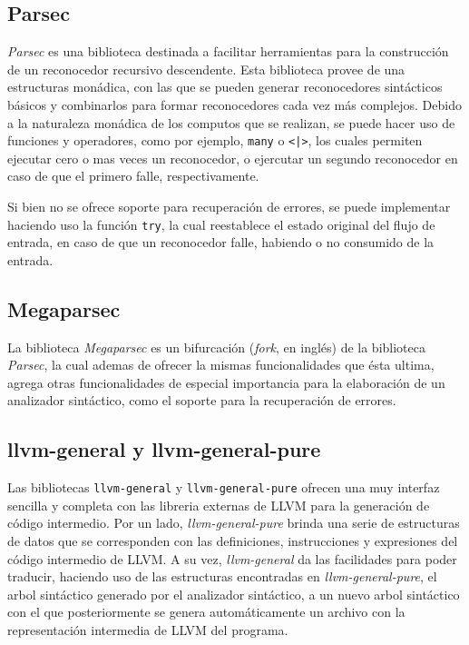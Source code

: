 \subsection{Parsec}
\textit{Parsec} es una biblioteca destinada a facilitar herramientas para la
construcción de un reconocedor recursivo descendente. Esta biblioteca provee
de una estructuras monádica, con las que se pueden generar reconocedores
sintácticos básicos y combinarlos para formar reconocedores cada vez más
complejos. Debido a la naturaleza monádica de los computos que se realizan, se
puede hacer uso de funciones y operadores, como por ejemplo, \texttt{many} o
\texttt{<|>}, los cuales permiten ejecutar cero o mas veces un reconocedor, o
ejercutar un segundo reconocedor en caso de que el primero falle,
respectivamente.

Si bien no se ofrece soporte para recuperación de errores, se puede
implementar haciendo uso la función \texttt{try}, la cual reestablece el
estado original del flujo de entrada, en caso de que un reconocedor falle,
habiendo o no consumido de la entrada.


\subsection{Megaparsec}
La biblioteca \textit{Megaparsec} es un bifurcación (\emph{fork}, en inglés)
de la biblioteca \textit{Parsec}, la cual ademas de ofrecer la mismas
funcionalidades que ésta ultima, agrega otras funcionalidades de especial
importancia para la elaboración de un analizador sintáctico, como el soporte
para la recuperación de errores.

\subsection{llvm-general y llvm-general-pure}
Las bibliotecas \texttt{llvm-general} y \texttt{llvm-general-pure} ofrecen una
muy interfaz sencilla y completa con las libreria externas de LLVM para la
generación de código intermedio. Por un lado, \textit{llvm-general-pure}
brinda una serie de estructuras de datos que se corresponden con las
definiciones, instrucciones y expresiones del código intermedio de LLVM. A su
vez, \textit{llvm-general} da las facilidades para poder traducir, haciendo
uso de las estructuras encontradas en \textit{llvm-general-pure}, el arbol
sintáctico generado por el analizador sintáctico, a un nuevo arbol sintáctico
con el que posteriormente se genera automáticamente un archivo con la
representación intermedia de LLVM del programa.

